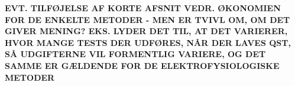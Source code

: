 \textbf{EVT. TILFØJELSE AF KORTE AFSNIT VEDR. ØKONOMIEN FOR DE ENKELTE METODER - MEN ER TVIVL OM, OM DET GIVER MENING? EKS. LYDER DET TIL, AT DET VARIERER, HVOR MANGE TESTS DER UDFØRES, NÅR DER LAVES QST, SÅ UDGIFTERNE VIL FORMENTLIG VARIERE, OG DET SAMME ER GÆLDENDE FOR DE ELEKTROFYSIOLOGISKE METODER}
